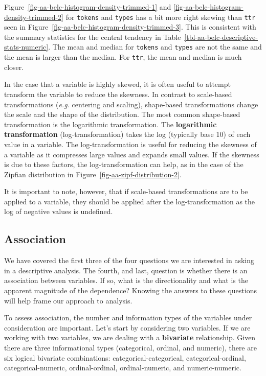 \documentclass[
  letterpaper,
  DIV=11,
  numbers=noendperiod]{scrreprt}
\theoremstyle{definition}
\theoremstyle{remark}
\begin{document}
Figure~\ref{fig-aa-belc-histogram-density-trimmed-1} and
\ref{fig-aa-belc-histogram-density-trimmed-2} for \texttt{tokens} and
\texttt{types} has a bit more right skewing than \texttt{ttr} seen in
Figure~\ref{fig-aa-belc-histogram-density-trimmed-3}. This is consistent
with the summary statistics for the central tendency in
Table~\ref{tbl-aa-belc-descriptive-stats-numeric}. The mean and median
for \texttt{tokens} and \texttt{types} are not the same and the mean is
larger than the median. For \texttt{ttr}, the mean and median is much
closer.

In the case that a variable is highly skewed, it is often useful to
attempt transform the variable to reduce the skewness. In contrast to
scale-based transformations (\emph{e.g.} centering and scaling),
shape-based transformations change the scale and the shape of the
distribution. The most common shape-based transformation is the
logarithmic transformation. The \textbf{logarithmic transformation}
(log-transformation) takes the log (typically base 10) of each value in
a variable. The log-transformation is useful for reducing the skewness
of a variable as it compresses large values and expands small values. If
the skewness is due to these factors, the log-transformation can help,
as in the case of the Zipfian distribution in
Figure~\ref{fig-aa-zipf-distribution-2}.

It is important to note, however, that if scale-based transformations
are to be applied to a variable, they should be applied after the
log-transformation as the log of negative values is undefined.

\subsection{Association}\label{association}

We have covered the first three of the four questions we are interested
in asking in a descriptive analysis. The fourth, and last, question is
whether there is an association between variables. If so, what is the
directionality and what is the apparent magnitude of the dependence?
Knowing the answers to these questions will help frame our approach to
analysis.

To assess association, the number and information types of the variables
under consideration are important. Let's start by considering two
variables. If we are working with two variables, we are dealing with a
\textbf{bivariate} relationship. Given there are three informational
types (categorical, ordinal, and numeric), there are six logical
bivariate combinations: categorical-categorical, categorical-ordinal,
categorical-numeric, ordinal-ordinal, ordinal-numeric, and
numeric-numeric.
\end{document}

